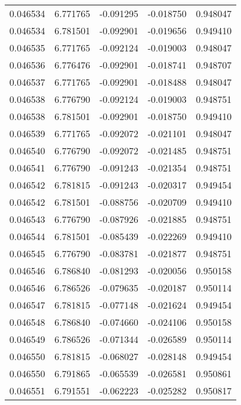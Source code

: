 \begin{tabular}{lrrrr}
0.046534    &  6.771765 & -0.091295 & -0.018750 &             0.948047 \\
0.046534    &  6.781501 & -0.092901 & -0.019656 &             0.949410 \\
0.046535    &  6.771765 & -0.092124 & -0.019003 &             0.948047 \\
0.046536    &  6.776476 & -0.092901 & -0.018741 &             0.948707 \\
0.046537    &  6.771765 & -0.092901 & -0.018488 &             0.948047 \\
0.046538    &  6.776790 & -0.092124 & -0.019003 &             0.948751 \\
0.046538    &  6.781501 & -0.092901 & -0.018750 &             0.949410 \\
0.046539    &  6.771765 & -0.092072 & -0.021101 &             0.948047 \\
0.046540    &  6.776790 & -0.092072 & -0.021485 &             0.948751 \\
0.046541    &  6.776790 & -0.091243 & -0.021354 &             0.948751 \\
0.046542    &  6.781815 & -0.091243 & -0.020317 &             0.949454 \\
0.046542    &  6.781501 & -0.088756 & -0.020709 &             0.949410 \\
0.046543    &  6.776790 & -0.087926 & -0.021885 &             0.948751 \\
0.046544    &  6.781501 & -0.085439 & -0.022269 &             0.949410 \\
0.046545    &  6.776790 & -0.083781 & -0.021877 &             0.948751 \\
0.046546    &  6.786840 & -0.081293 & -0.020056 &             0.950158 \\
0.046546    &  6.786526 & -0.079635 & -0.020187 &             0.950114 \\
0.046547    &  6.781815 & -0.077148 & -0.021624 &             0.949454 \\
0.046548    &  6.786840 & -0.074660 & -0.024106 &             0.950158 \\
0.046549    &  6.786526 & -0.071344 & -0.026589 &             0.950114 \\
0.046550    &  6.781815 & -0.068027 & -0.028148 &             0.949454 \\
0.046550    &  6.791865 & -0.065539 & -0.026581 &             0.950861 \\
0.046551    &  6.791551 & -0.062223 & -0.025282 &             0.950817 \\

\end{tabular}
